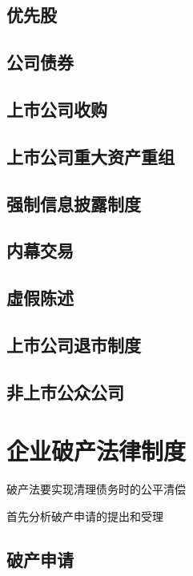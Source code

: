 \documentclass[UTF8,12pt]{ctexart}
\numberwithin{equation}{section} %
\numberwithin{figure}{section}
\numberwithin{table}{section}
\begin{document}
	\subsection{优先股}
	
	\subsection{公司债券}
	
	\subsection{上市公司收购}
	
	\subsection{上市公司重大资产重组}
	
	\subsection{强制信息披露制度}
	
	\subsection{内幕交易}
	
	\subsection{虛假陈述}
	
	\subsection{上市公司退市制度}
	
	\subsection{非上市公众公司}

	
	\newpage


 	\section{企业破产法律制度}
	破产法要实现清理债务时的公平清偿
	
	首先分析破产申请的提出和受理
	
	\subsection{破产申请}
	
\end{document}
